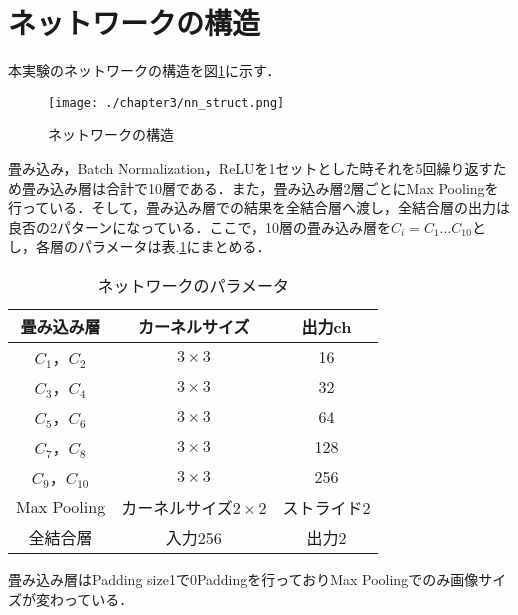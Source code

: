 \section{ネットワークの構造}
本実験のネットワークの構造を図\ref{fig_nnst}に示す．
\begin{figure}[]
  \begin{center}
    \texttt{[image: ./chapter3/nn\_struct.png]}
    \caption{ネットワークの構造}
    \label{fig_nnst}
  \end{center}
\end{figure}

畳み込み，Batch Normalization，ReLUを1セットとした時それを5回繰り返すため畳み込み層は合計で10層である．また，畳み込み層2層ごとにMax Poolingを行っている．そして，畳み込み層での結果を全結合層へ渡し，全結合層の出力は良否の2パターンになっている．ここで，10層の畳み込み層を$C_i = C_1 \ldots C_{10}$とし，各層のパラメータは表.\ref{table_network_parameter}にまとめる．
\begin{table}
  \caption{ネットワークのパラメータ}
  \label{table_network_parameter}
  \centering
  \begin{tabular}{ccc}
    \hline
    畳み込み層  & カーネルサイズ & 出力ch \\
    \hline \hline
    $C_1$，$C_2$ & $3\times 3$ & 16\\
    $C_3$，$C_4$ & $3\times 3$ & 32\\
    $C_5$，$C_6$ & $3\times 3$ & 64\\
    $C_7$，$C_8$ & $3\times 3$ & 128\\
    $C_9$，$C_10$ & $3\times 3$ & 256\\
    \hline
    Max Pooling & カーネルサイズ$2\times 2$ & ストライド2\\
    全結合層 & 入力256 & 出力2\\
    \hline
  \end{tabular}
\end{table}

畳み込み層はPadding size1で0Paddingを行っておりMax Poolingでのみ画像サイズが変わっている．
